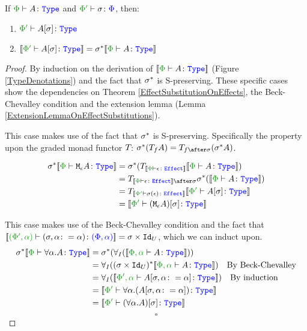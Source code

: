 \documentclass{Report}
\begin{document}
\begin{framed}
    \begin{theorem}\label{EffectSubstitutionOnTypes}
       If $\wellformedtype{\P}{A}$ and $\typerelation{\P'}{\si}{\P}$, then:
       \begin{enumerate}[label=\roman*.]
           \item $\wellformedtype{\P'}{A\ssi}$
           \item $\deno{\wellformedtype{\P'}{A\ssi}} = \si\star\deno{\wellformedtype{\P}{A}}$
       \end{enumerate}
    \end{theorem}
    
    \begin{proof}
       By induction on the derivation of $\deno{\wellformedtype{\P}{A}}$ (Figure \ref{TypeDenotations}) and the fact that $\sigma^*$ is S-preserving. These specific cases show the dependencies on Theorem \ref{EffectSubstitutionOnEffects}, the Beck-Chevalley condition and the extension lemma (Lemma \ref{ExtensionLemmaOnEffectSubstitutions}).
    
        \case{\teffect}
        This case makes use of the fact that $\sigma^*$ is S-preserving. Specifically the property upon the graded monad functor $T_{}{}$: $\si\star(\T{f}{A}) = \T{f\after\si}{(\si\star A)}$.
    
    
        \begin{align*}
            \si\star\deno{\typerelation{\P}{\mea}{\type}} & =  \si\star(\T{\deno{\typerelation{\P}{\e}{\effect}}}{\deno{\typerelation{\P}{A}{\type}}})\\
            &= \T{\deno{\typerelation{\P}{\e}{\effect}}\after\si}{\si\star(\deno{\typerelation{\P}{A}{\type}})}\\
            & = \T{\deno{\wellformedeffect{\P'}{\si(\e)}}}{\deno{\wellformedtype{\P'}{A\ssi}}}\\
            & = \deno{\typerelation{\P'}{(\mea)\ssi}{\type}}
        \end{align*}
        
        \case{\tquant}
        This case makes use of the Beck-Chevalley condition and the fact that $\deno{\typerelation{(\P', \a)}{(\si, \a\setto\a)}{(\P, \a)}} = \si\times\Id{U}$, which we can induct upon.
            \begin{align*}
                \si\star\deno{\typerelation{\P}{\all{\a}A}{\type}} & = \si\star(\allI(\deno{\typerelation{\P,\a}{A}{\type}}))\\
                & = \allI((\si\times\Id{U})\star\deno{\typerelation{\P,\a}{A}{\type}})\qt{By Beck-Chevalley}\\
                & = \allI(\deno{\typerelation{\P',\a}{A\sub{\si, \a\setto\a}}{\type}})\qt{By induction}\\
                & = \deno{\typerelation{\P'}{\all{\a}{(A\sub{\si, \a\setto\a})}}{\type}}\\
                & = \deno{\typerelation{\P'}{(\all{\a}{A})\ssi}{\type}}\\
            \end{align*}
            $$\square$$
    \end{proof}
\end{framed}
\end{document}
